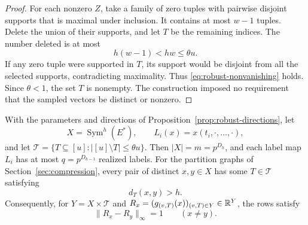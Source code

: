 \begin{proof}
For each nonzero $Z$, take a family of zero tuples with pairwise disjoint
supports that is maximal under inclusion.  It contains at most $w-1$
tuples.  Delete the union of their supports, and let $T$ be the remaining
indices.  The number deleted is at most
\[
  h(w-1)<hw\le\theta u.
\]
If any zero tuple were supported in $T$, its support would be disjoint
from all the selected supports, contradicting maximality.  Thus
\eqref{eq:robust-nonvanishing} holds.  Since $\theta<1$, the set $T$ is
nonempty.  The construction imposed no requirement that the sampled
vectors be distinct or nonzero.
\end{proof}

\begin{proposition}
\label{prop:separated-rows}
With the parameters and directions of
Proposition~\ref{prop:robust-directions}, let
\[
  X=\operatorname{Sym}^h(E^*),\qquad
  L_i(x)=x(t_i,\cdot,\ldots,\cdot),
\]
and let $\mathcal T=\{T\subseteq[u]:|[u]\setminus T|\le\theta u\}$.
Then $|X|=m=p^{D_h}$, and each label map $L_i$ has at most
$q=p^{D_{h-1}}$ realized labels.  For the partition graphs of
Section~\ref{sec:compression}, every pair of distinct $x,y\in X$ has
some $T\in\mathcal T$ satisfying
\begin{equation}
  d_T(x,y)>h.
  \label{eq:graph-separation}
\end{equation}
Consequently, for $Y=X\times\mathcal T$ and
$R_x=(g_{(v,T)}(x))_{(v,T)\in Y}\in\mathbb R^Y$, the rows satisfy
\begin{equation}
  \|R_x-R_y\|_\infty=1\qquad(x\ne y).
  \label{eq:row-separation}
\end{equation}
\end{proposition}

